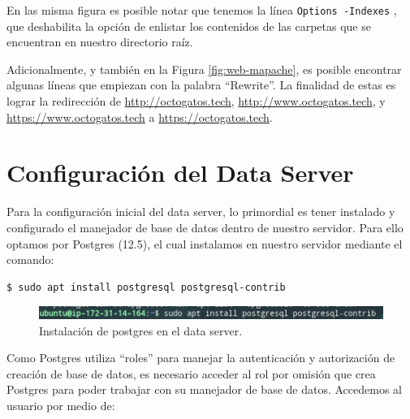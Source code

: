 \documentclass{article}
\newcommand{\ttt}[1]{%
\texttt{#1}%
}
\begin{document}
En las misma figura es posible notar que tenemos
la l\'inea \ttt{Options -Indexes}, que deshabilita
la opci\'on de enlistar los contenidos de las carpetas
que se encuentran en nuestro directorio ra\'iz.

Adicionalmente, y tambi\'en en la Figura \ref{fig:web-mapache},
es posible encontrar algunas l\'ineas que empiezan con
la palabra ``Rewrite''.   La finalidad de estas es lograr
la redirecci\'on de
\href{http://octogatos.tech}{http://octogatos.tech},
\href{http://www.octogatos.tech}{http://www.octogatos.tech}, y
\href{https://www.octogatos.tech}{https://www.octogatos.tech}
a \href{https://octogatos.tech}{https://octogatos.tech}.





\newpage
\section{Configuración del Data Server}

Para la configuración inicial del data server, lo primordial
es tener instalado y configurado el manejador de base de datos
dentro de nuestro servidor. Para ello optamos por Postgres
(12.5), el cual instalamos en nuestro servidor mediante el
comando:

\begin{lstlisting}
$ sudo apt install postgresql postgresql-contrib
\end{lstlisting}

\begin{figure}[H]
  \centering
  \includegraphics[width=\textwidth]{DATASERVER/exhibitA}
  \caption{Instalación de postgres en el data server.}
  \label{fig:DATASERVER-A}
\end{figure}

Como Postgres utiliza ``roles'' para manejar la autenticación y
autorización de creación de base de datos, es necesario acceder
al rol por omisión que crea Postgres para poder trabajar con su
manejador de base de datos. Accedemos al usuario por medio de:
\end{document}

